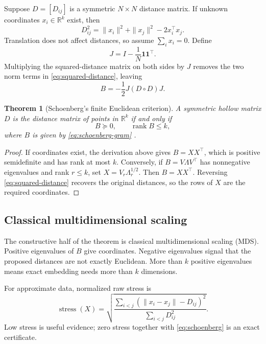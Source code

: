 \documentclass[11pt]{article}
\newtheorem{theorem}{Theorem}[section]
\theoremstyle{definition}
\theoremstyle{remark}
\newcommand{\R}{\mathbb R}
\newcommand{\rank}{\operatorname{rank}}
\newcommand{\one}{\mathbf 1}
\begin{document}
Suppose $D=[D_{ij}]$ is a symmetric $N\times N$ distance matrix. If unknown
coordinates $x_i\in\R^k$ exist, then
\begin{equation}
 D_{ij}^2=\|x_i\|^2+\|x_j\|^2-2x_i^\top x_j.
 \label{eq:squared-distance}
\end{equation}
Translation does not affect distances, so assume $\sum_i x_i=0$. Define
\begin{equation}
 J=I-\frac1N\one\one^\top.
 \label{eq:centering}
\end{equation}
Multiplying the squared-distance matrix on both sides by $J$ removes the two
norm terms in \cref{eq:squared-distance}, leaving
\begin{equation}
  B=-\frac12J(D\circ D)J.
  \label{eq:schoenberg-gram}
\end{equation}

\begin{theorem}[Schoenberg's finite Euclidean criterion]
\label{thm:schoenberg}
A symmetric hollow matrix $D$ is the distance matrix of points in
$\R^k$ if and only if
\begin{equation}
  B\succeq0,\qquad \rank B\le k,
  \label{eq:schoenberg}
\end{equation}
where $B$ is given by \cref{eq:schoenberg-gram}
\cite{schoenberg1935,gower1966}.
\end{theorem}

\begin{proof}
If coordinates exist, the derivation above gives $B=XX^\top$, which is
positive semidefinite and has rank at most $k$. Conversely, if
$B=V\Lambda V^\top$ has nonnegative eigenvalues and rank $r\le k$, set
$X=V_r\Lambda_r^{1/2}$. Then $B=XX^\top$. Reversing
\cref{eq:squared-distance} recovers the original distances, so the rows of
$X$ are the required coordinates.
\end{proof}

\subsection{Classical multidimensional scaling}

The constructive half of the theorem is classical multidimensional scaling
(MDS). Positive eigenvalues of $B$ give coordinates. Negative eigenvalues
signal that the proposed distances are not exactly Euclidean. More than $k$
positive eigenvalues means exact embedding needs more than $k$ dimensions.

For approximate data, normalized raw stress is
\begin{equation}
 \operatorname{stress}(X)=
 \sqrt{
 \frac{\sum_{i<j}(\|x_i-x_j\|-D_{ij})^2}
      {\sum_{i<j}D_{ij}^2}
 }.
 \label{eq:stress}
\end{equation}
Low stress is useful evidence; zero stress together with
\cref{eq:schoenberg} is an exact certificate.
\end{document}
